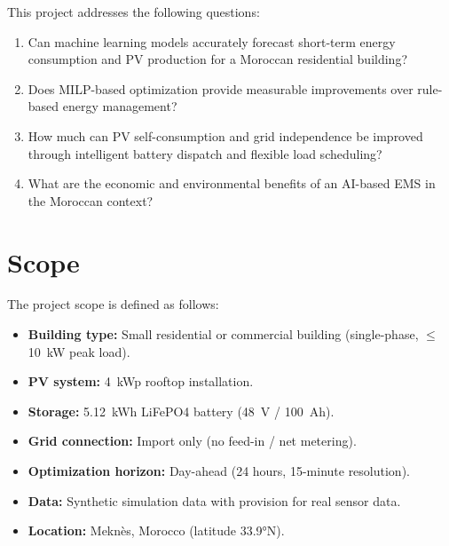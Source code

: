 This project addresses the following questions:

\begin{enumerate}
    \item Can machine learning models accurately forecast short-term energy consumption and PV production for a Moroccan residential building?
    \item Does MILP-based optimization provide measurable improvements over rule-based energy management?
    \item How much can PV self-consumption and grid independence be improved through intelligent battery dispatch and flexible load scheduling?
    \item What are the economic and environmental benefits of an AI-based EMS in the Moroccan context?
\end{enumerate}

\section{Scope}

The project scope is defined as follows:

\begin{itemize}
    \item \textbf{Building type:} Small residential or commercial building (single-phase, $\leq$10~kW peak load).
    \item \textbf{PV system:} 4~kWp rooftop installation.
    \item \textbf{Storage:} 5.12~kWh LiFePO4 battery (48~V / 100~Ah).
    \item \textbf{Grid connection:} Import only (no feed-in / net metering).
    \item \textbf{Optimization horizon:} Day-ahead (24 hours, 15-minute resolution).
    \item \textbf{Data:} Synthetic simulation data with provision for real sensor data.
    \item \textbf{Location:} Meknès, Morocco (latitude 33.9°N).
\end{itemize}
